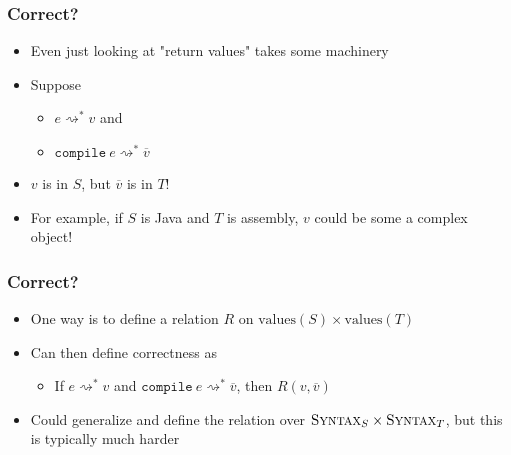 \documentclass[usenames,dvipsnames]{beamer}
\newcommand{\compile}{\texttt{compile}}
\newcommand{\syn}{\textsc{Syntax}}
\begin{document}
\begin{frame}
  \frametitle{Correct?}

  \begin{itemize}
    \item Even just looking at "return values" takes some machinery

    \item Suppose
      \begin{itemize}
        \item $e \rightsquigarrow^* v$ and
        \item $\compile\ e \rightsquigarrow^* \overline{v}$
      \end{itemize}

    \item $v$ is in $S$, but $\overline{v}$ is in $T$!

    \item For example, if $S$ is Java and $T$ is assembly, $v$ could be some
      a complex object!
  \end{itemize}
\end{frame}


\begin{frame}
  \frametitle{Correct?}

  \begin{itemize}
    \item One way is to define a relation $R$ on $\text{values}(S) \times
      \text{values}(T)$

    \item Can then define correctness as
      \begin{itemize}
        \item If $e \rightsquigarrow^* v$ and $\compile\ e \rightsquigarrow^*
          \overline{v}$, then $R(v, \overline{v})$
      \end{itemize}

    \item Could generalize and define the relation over $\syn_S \times \syn_T$,
      but this is typically much harder
  \end{itemize}
\end{frame}

\end{document}
